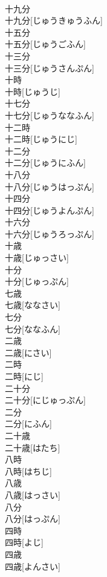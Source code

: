 \documentclass[8pt]{extreport}
\begin{document}
\begin{CJK}{UTF8}{min}
\\	十九分	
\\	十九分[じゅうきゅうふん]
\\	十五分	
\\	十五分[じゅうごふん]
\\	十三分	
\\	十三分[じゅうさんぷん]
\\	十時	
\\	十時[じゅうじ]
\\	十七分	
\\	十七分[じゅうななふん]
\\	十二時	
\\	十二時[じゅうにじ]
\\	十二分	
\\	十二分[じゅうにふん]
\\	十八分	
\\	十八分[じゅうはっぷん]
\\	十四分	
\\	十四分[じゅうよんぷん]
\\	十六分	
\\	十六分[じゅうろっぷん]
\\	十歳	
\\	十歳[じゅっさい]
\\	十分	
\\	十分[じゅっぷん]
\\	七歳	
\\	七歳[ななさい]
\\	七分	
\\	七分[ななふん]
\\	二歳	
\\	二歳[にさい]
\\	二時	
\\	二時[にじ]
\\	二十分	
\\	二十分[にじゅっぷん]
\\	二分	
\\	二分[にふん]
\\	二十歳	
\\	二十歳[はたち]
\\	八時	
\\	八時[はちじ]
\\	八歳	
\\	八歳[はっさい]
\\	八分	
\\	八分[はっぷん]
\\	四時	
\\	四時[よじ]
\\	四歳	
\\	四歳[よんさい]

\end{CJK}
\end{document}
